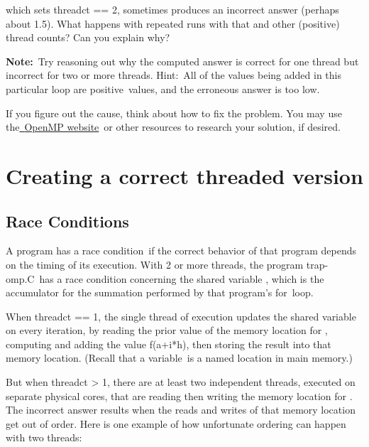 \documentclass[letterpaper,10pt,openany,oneside]{sphinxmanual}
\begin{document}
which sets threadct == 2, sometimes produces an incorrect answer (perhaps about
1.5). What happens with repeated runs with that and other (positive)
thread counts? Can you explain why?

\textbf{Note:} Try reasoning out why the computed answer is correct for one
thread but incorrect for two or more threads. Hint: All of the values
being added in this particular loop are positive values, and the
erroneous answer is too low.

If you figure out the cause, think about how to fix the problem. You may
use the\href{http://openmp.org/wp/}{ }\href{http://openmp.org/wp/}{OpenMP
website} or other resources to research your
solution, if desired.


\chapter{Creating a correct threaded version}
\label{correctOpenMP/FixingOurOpenMPcode:creating-a-correct-threaded-version}\label{correctOpenMP/FixingOurOpenMPcode::doc}

\section{Race Conditions}
\label{correctOpenMP/FixingOurOpenMPcode:race-conditions}
A program has a race condition if the correct behavior of that program
depends on the timing of its execution. With 2 or more threads, the
program trap-omp.C has a race condition concerning the shared variable
, which is the accumulator for the summation performed by that
program's for loop.

When threadct == 1, the single thread of execution updates the shared variable
 on every iteration, by reading the prior value of the memory location for
, computing and adding the value f(a+i*h), then storing the result into that memory location. (Recall that a variable is a named location in main memory.)

But when threadct \textgreater{} 1, there are at least two independent threads, executed on separate physical cores, that are reading then writing the memory location for
. The incorrect answer results when the reads and writes of that memory location get out of order. Here is one example of how unfortunate ordering can happen with two threads:
\end{document}
